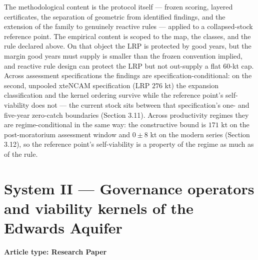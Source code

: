 The methodological content is the protocol itself --- frozen scoring,
layered certificates, the separation of geometric from identified
findings, and the extension of the family to genuinely reactive rules
--- applied to a collapsed-stock reference point. The empirical content
is scoped to the map, the classes, and the rule declared above. On that
object the LRP is protected by good years, but the margin good years
must supply is smaller than the frozen convention implied, and reactive
rule design can protect the LRP but not out-supply a flat 60-kt cap.
Across assessment specifications the findings are
specification-conditional: on the second, unpooled xteNCAM specification
(LRP \(276\) kt) the expansion classification and the kernel ordering
survive while the reference point's self-viability does not --- the
current stock sits between that specification's one- and five-year
zero-catch boundaries (Section 3.11). Across productivity regimes they are
regime-conditional in the same way: the constructive bound is
\(171\) kt on the post-moratorium assessment window and \(0 \pm 8\)
kt on the modern series (Section 3.12), so the reference point's
self-viability is a property of the regime as much as of the rule.

\part*{System II --- Governance operators and viability kernels of the Edwards Aquifer}
\label{part:edwards}

{\centering\small \textbf{Article type: Research Paper}\par}

